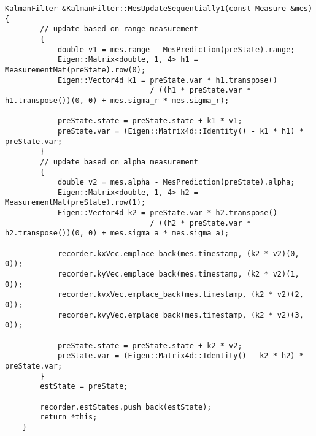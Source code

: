 \documentclass[12pt, onecolumn]{article}
\newcommand\normf{\fangsong}
\begin{document}
	\begin{lstlisting}[caption={\normf “逐次量测更新(先距离后角度)”算法实现}]
    KalmanFilter &KalmanFilter::MesUpdateSequentially1(const Measure &mes) {
        // update based on range measurement
        {
            double v1 = mes.range - MesPrediction(preState).range;
            Eigen::Matrix<double, 1, 4> h1 = MeasurementMat(preState).row(0);
            Eigen::Vector4d k1 = preState.var * h1.transpose()
                                 / ((h1 * preState.var * h1.transpose())(0, 0) + mes.sigma_r * mes.sigma_r);

            preState.state = preState.state + k1 * v1;
            preState.var = (Eigen::Matrix4d::Identity() - k1 * h1) * preState.var;
        }
        // update based on alpha measurement
        {
            double v2 = mes.alpha - MesPrediction(preState).alpha;
            Eigen::Matrix<double, 1, 4> h2 = MeasurementMat(preState).row(1);
            Eigen::Vector4d k2 = preState.var * h2.transpose()
                                 / ((h2 * preState.var * h2.transpose())(0, 0) + mes.sigma_a * mes.sigma_a);

            recorder.kxVec.emplace_back(mes.timestamp, (k2 * v2)(0, 0));
            recorder.kyVec.emplace_back(mes.timestamp, (k2 * v2)(1, 0));
            recorder.kvxVec.emplace_back(mes.timestamp, (k2 * v2)(2, 0));
            recorder.kvyVec.emplace_back(mes.timestamp, (k2 * v2)(3, 0));

            preState.state = preState.state + k2 * v2;
            preState.var = (Eigen::Matrix4d::Identity() - k2 * h2) * preState.var;
        }
        estState = preState;

        recorder.estStates.push_back(estState);
        return *this;
    }
	\end{lstlisting}
	
\end{document}
